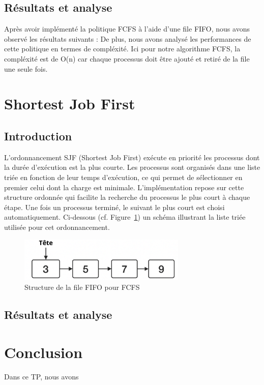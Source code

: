 \subsection{Résultats et analyse}

Après avoir implémenté la politique FCFS à l'aide d'une file FIFO, nous avons observé les résultats suivants :
De plus, nous avons analysé les performances de cette politique en termes de compléxité. Ici pour notre algorithme FCFS, la compléxité est de O(n) car chaque processus doit être ajouté et retiré de la file une seule fois.

\newpage


\section{Shortest Job First}
\subsection{Introduction}
L’ordonnancement SJF (Shortest Job First) exécute en priorité les processus dont la durée d’exécution est la plus courte. Les processus sont organisés dans une liste triée en fonction de leur temps d’exécution, ce qui permet de sélectionner en premier celui dont la charge est minimale.
L’implémentation repose sur cette structure ordonnée qui facilite la recherche du processus le plus court à chaque étape. Une fois un processus terminé, le suivant le plus court est choisi automatiquement.
Ci-dessous (cf. Figure~\ref{fig:lst_trie}) un schéma illustrant la liste triée utilisée pour cet ordonnancement.
\begin{figure}[H]
    \centering
    \includegraphics[width=8cm]{../images/lst_trie.png}
    \caption{Structure de la file FIFO pour FCFS}
    \label{fig:lst_trie}
\end{figure}

\subsection{Résultats et analyse}

\newpage

\section{Conclusion}

Dans ce TP, nous avons 